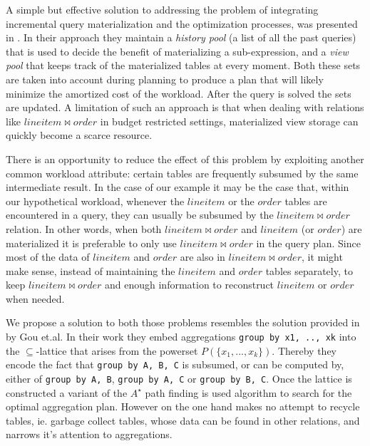 A simple but effective solution to addressing the problem of
integrating incremental query materialization and the optimization
processes, was presented in
\cite{perezHistoryawareQueryOptimization}. In their approach they
maintain a \emph{history pool} (a list of all the past queries) that is
used to decide the benefit of materializing a sub-expression, and a
\emph{view pool} that keeps track of the materialized tables at every
moment. Both these sets are taken into account during planning to
produce a plan that will likely minimize the amortized cost of the
workload. After the query is solved the sets are updated. A limitation
of such an approach is that when dealing with relations like
\(lineitem \Join order\) in budget restricted settings, materialized
view storage can quickly become a scarce resource.

There is an opportunity to reduce the effect of this problem by
exploiting another common workload attribute: certain tables are
frequently subsumed by the same intermediate result. In the case of
our example it may be the case that, within our hypothetical workload,
whenever the \(lineitem\) or the \(order\) tables are encountered in a
query, they can usually be subsumed by the \(lineitem \Join order\)
relation. In other words, when both \(lineitem \Join order\) and
\(lineitem\) (or \(order\)) are materialized it is preferable to only use
\(lineitem \Join order\) in the query plan. Since most of the data of
\(lineitem\) and \(order\) are also in \(lineitem \Join order\), it might
make sense, instead of maintaining the \(lineitem\) and \(order\) tables
separately, to keep \(lineitem \Join order\) and enough information to
reconstruct \(lineitem\) or \(order\) when needed.

We propose a solution to both those problems resembles the solution
provided in \cite{gouSupSearchEfficient2006} by Gou et.al. In their work
they embed aggregations \texttt{group by x1, .., xk} into the
\(\subseteq\)-lattice that arises from the powerset \(P(\{x_1, ...,
x_k\})\). Thereby they encode the fact that \texttt{group by A, B, C} is
subsumed, or can be computed by, either of \texttt{group by A, B}, \texttt{group by
  A, C} or \texttt{group by B, C}. Once the lattice is constructed a variant of
the \(A^{\star}\) path finding is used algorithm to search for the
optimal aggregation plan. However \cite{gouSupSearchEfficient2006} on
the one hand makes no attempt to recycle tables, ie. garbage collect
tables, whose data can be found in other relations, and narrows it's
attention to aggregations.

